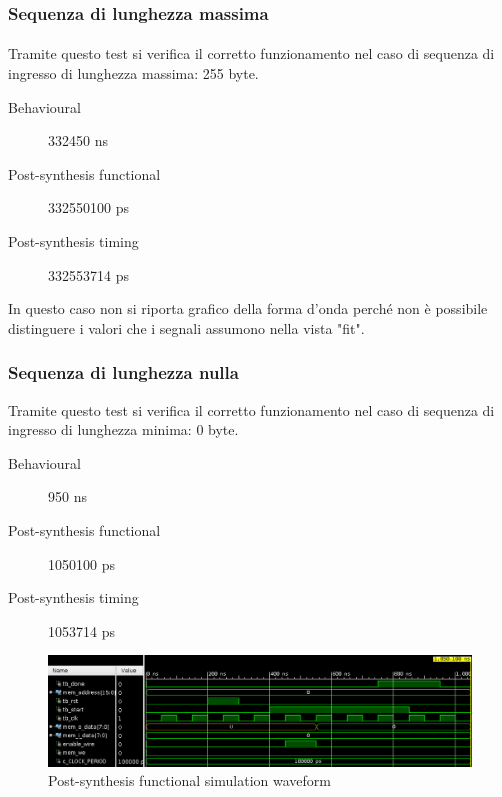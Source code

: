 \documentclass{article}
\begin{document}
\subsubsection{Sequenza di lunghezza massima}
\paragraph{}Tramite questo test si verifica il corretto funzionamento nel caso di sequenza di ingresso di lunghezza massima: 255 byte.
\begin{description}
	\item[Behavioural] 332450 ns
	\item[Post-synthesis functional] 332550100 ps
	\item[Post-synthesis timing] 332553714 ps
\end{description}
In questo caso non si riporta grafico della forma d'onda perché non è possibile distinguere i valori che i segnali assumono nella vista "fit".

\subsubsection{Sequenza di lunghezza nulla}
Tramite questo test si verifica il corretto funzionamento nel caso di sequenza di ingresso di lunghezza minima: 0 byte.
\begin{description}
	\item[Behavioural] 950 ns
	\item[Post-synthesis functional] 1050100 ps
	\item[Post-synthesis timing] 1053714 ps
\end{description}
\begin{figure}[H]
	\centering
	\includegraphics[width=1\textwidth]{Assets/tb4.png}
	\caption{Post-synthesis functional simulation waveform}
\end{figure}
\end{document}
